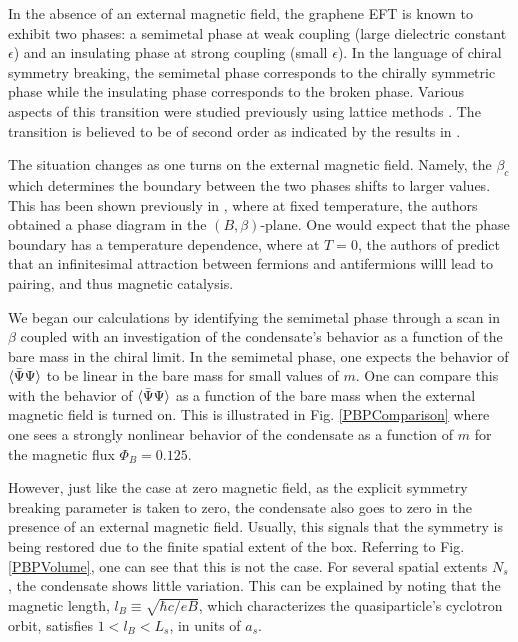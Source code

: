 \documentclass[aps,prd,twocolumn,showpacs,superscriptaddress,groupedaddress]{revtex4}  %
\begin{document}
In the absence of an external magnetic field, the graphene EFT is known to exhibit two phases: a semimetal phase at weak coupling (large dielectric constant $\epsilon$) and an insulating phase at strong coupling (small $\epsilon$). 
In the language of chiral symmetry breaking, the semimetal phase corresponds to the chirally symmetric phase while the insulating phase corresponds to the broken phase.
Various aspects of this transition were studied previously using lattice methods \cite{Drut1, Drut2, Hands1, Giedt}. The transition is believed to be of second order as indicated by the results in \cite{Drut2}. 

The situation changes as one turns on the external magnetic field. Namely, the $\beta_c$ which determines the boundary between the two phases shifts to larger values. This has been shown previously in \cite{Polikarpov}, where at fixed temperature, the authors
obtained a phase diagram in the $(B, \beta)$-plane. One would expect that the phase boundary has a temperature dependence, where at $T=0$, the authors of \cite{Miransky1,Miransky2,Miransky3,Miransky4,MiranskyGraphene1,MiranskyGraphene2,MiranskyGraphene3} predict that an infinitesimal attraction between fermions and antifermions willl lead to pairing, and thus magnetic catalysis.

We began our calculations by identifying the semimetal phase through a scan in $\beta$ coupled with an investigation of the condensate's behavior as a function of the bare mass in the chiral limit. In the semimetal phase, one expects the behavior of ${\langle {\bar \Psi} \Psi \rangle}$ to be linear in the bare mass for small values of $m$. 
One can compare this with the behavior of ${\langle {\bar \Psi} \Psi \rangle}$ as a function of the bare mass when the external magnetic field is turned on. This is illustrated in Fig. \ref{PBPComparison} where one sees a strongly nonlinear behavior of the condensate as a function of $m$ for the magnetic flux $\Phi_B = 0.125$.

However, just like the case at zero magnetic field, as the explicit symmetry breaking parameter is taken to zero, the condensate also goes to zero in the presence of an external magnetic field. Usually, this signals that the symmetry is being restored due to the finite spatial extent of the box. Referring to Fig. \ref{PBPVolume}, one can see that this is not the
case. For several spatial extents $N_s$, the condensate shows little variation. This can be explained by noting that the magnetic length, $l_B \equiv \sqrt{\hbar c/eB}$, which characterizes the quasiparticle's cyclotron orbit, satisfies $1 < l_B < L_s$, in units of $a_s$. 
\end{document}

